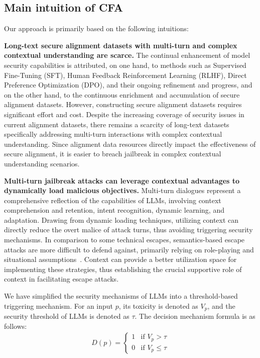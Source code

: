 \subsection{Main intuition of CFA}
\label{intuition}

Our approach is primarily based on the following intuitions:

\textbf{Long-text secure alignment datasets with multi-turn and complex contextual understanding are scarce.} The continual enhancement of model security capabilities is attributed, on one hand, to methods such as Supervised Fine-Tuning (SFT), Human Feedback Reinforcement Learning (RLHF), Direct Preference Optimization (DPO), and their ongoing refinement and progress, and on the other hand, to the continuous enrichment and accumulation of secure alignment datasets. However, constructing secure alignment datasets requires significant effort and cost. Despite the increasing coverage of security issues in current alignment datasets, there remains a scarcity of long-text datasets specifically addressing multi-turn interactions with complex contextual understanding. Since alignment data resources directly impact the effectiveness of secure alignment, it is easier to breach jailbreak in complex contextual understanding scenarios.


\textbf{Multi-turn jailbreak attacks can leverage contextual advantages to dynamically load malicious objectives.} Multi-turn dialogues represent a comprehensive reflection of the capabilities of LLMs, involving context comprehension and retention, intent recognition, dynamic learning, and adaptation. Drawing from dynamic loading techniques, utilizing context can directly reduce the overt malice of attack turns, thus avoiding triggering security mechanisms. In comparison to some technical escapes, semantics-based escape attacks are more difficult to defend against, primarily relying on role-playing and situational assumptions~\cite{liu2024hitchhiker}. Context can provide a better utilization space for implementing these strategies, thus establishing the crucial supportive role of context in facilitating escape attacks.

We have simplified the security mechanisms of LLMs into a threshold-based triggering mechanism. For an input $p$, its toxicity is denoted as $V_p$, and the security threshold of LLMs is denoted as $\tau$. The decision mechanism formula is as follows:
\begin{align}
D(p) = 
\begin{cases} 
1 & \text{if } V_p > \tau \\
0 & \text{if } V_p \leq \tau 
\end{cases}
\end{align}

